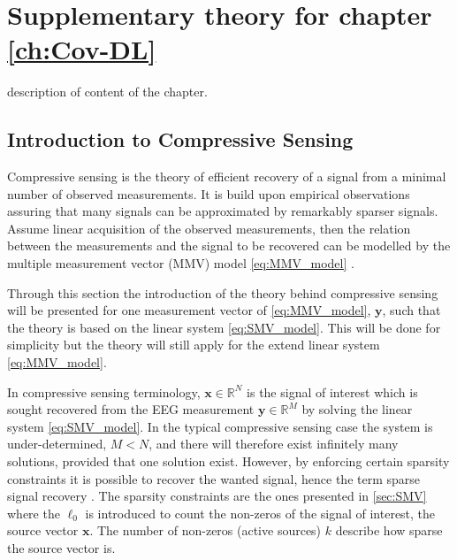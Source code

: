 \chapter{Supplementary theory for chapter \ref{ch:Cov-DL}}\label{app:Cov-DL}
description of content of the chapter.
\section{Introduction to Compressive Sensing}\label{app_sec:CS}
Compressive sensing is the theory of efficient recovery of a signal from a minimal number of observed measurements. 
It is build upon empirical observations assuring that many signals can be approximated by remarkably sparser signals.   
Assume linear acquisition of the observed measurements, then the relation between the measurements and the signal to be recovered can be modelled by the multiple measurement vector (MMV) model \eqref{eq:MMV_model} \cite{FR}. 

Through this section the introduction of the theory behind compressive sensing will be presented for one measurement vector of \eqref{eq:MMV_model}, $\mathbf{y}$, such that the theory is based on the linear system \eqref{eq:SMV_model}. This will be done for simplicity but the theory will still apply for the extend linear system \eqref{eq:MMV_model}.

In compressive sensing terminology, $\mathbf{x} \in \mathbb{R}^N$ is the signal of interest which is sought recovered from the EEG measurement $\mathbf{y} \in \mathbb{R}^M$ by solving the linear system \eqref{eq:SMV_model}. 
In the typical compressive sensing case the system is under-determined, $M < N$, and there will therefore exist infinitely many solutions, provided that one solution exist.
However, by enforcing certain sparsity constraints it is possible to recover the wanted signal, hence the term sparse signal recovery \cite{FR}. The sparsity constraints are the ones presented in \ref{sec:SMV} where the $\ell_0$ is introduced to count the non-zeros of the signal of interest, the source vector $\mathbf{x}$. The number of non-zeros (active sources) $k$ describe how sparse the source vector is.
 
